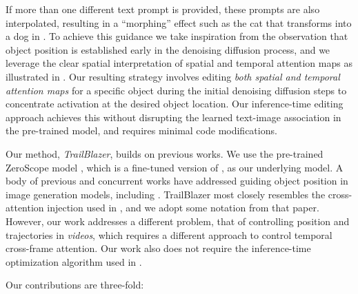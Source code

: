 If more than one different text prompt is provided, these prompts are also interpolated, resulting in a ``morphing'' effect such as the cat that transforms into a dog in . To achieve this guidance we take inspiration from the observation \cite{Magicmix} that object position is established early in the denoising diffusion process, and we leverage the clear spatial interpretation of spatial and temporal attention maps as illustrated in .
Our resulting strategy involves editing \emph{both spatial and temporal attention maps} for a specific object during the initial denoising diffusion steps to concentrate activation at the desired object location. Our inference-time editing approach achieves this without disrupting the learned text-image association in the pre-trained model, and requires minimal code modifications. 

Our method, \textit{TrailBlazer}, builds on previous works. We use the pre-trained ZeroScope model \cite{zeroscope}, which is a fine-tuned version of \cite{modelscope}, as our underlying model. A body of previous and concurrent works have addressed guiding object position in image generation models, including \cite{layout2im,L2Igan,L2Ixformer,ediffI,ma2023directed,boxdiff,GLIGEN,multidiffusion}.
TrailBlazer most closely resembles the cross-attention injection used in \cite{ma2023directed}, and we adopt some notation from that paper. However, our work addresses a different problem, that of controlling position and trajectories in \emph{videos}, which requires a different approach to control temporal cross-frame attention. Our work also does not require the inference-time optimization algorithm used in \cite{ma2023directed}.

Our contributions are three-fold:

